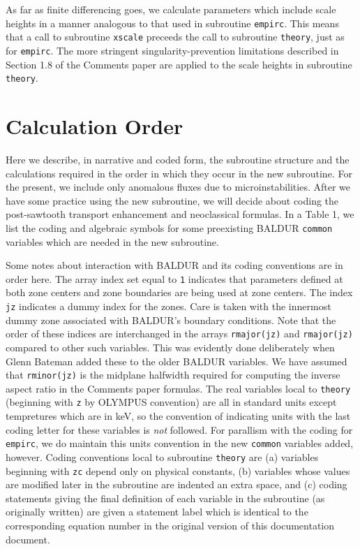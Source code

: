 As far as finite differencing goes, we calculate
parameters which include scale heights in a manner analogous to
that used in subroutine {\tt empirc}.  This means that a call to subroutine
{\tt xscale} preceeds the call to  subroutine {\tt theory},
just as for {\tt empirc}.  The more stringent singularity-prevention
limitations described in Section 1.8 of the Comments paper are applied
to the scale heights in subroutine {\tt theory}.


\section{Calculation Order}

Here we describe, in narrative and coded form,
the subroutine structure and the calculations required
in the order in which they occur in the new subroutine.
For the present, we include only anomalous fluxes due to microinstabilities.
After we have some practice using the new subroutine,
we will decide about coding the
post-sawtooth transport enhancement and neoclassical formulas.
In a Table 1, we list the coding
and algebraic symbols for some preexisting BALDUR
{\tt common} variables which are needed in the new subroutine.

Some notes about interaction with BALDUR and its coding
conventions are in order here.
The array index set equal to {\tt 1} indicates
that parameters defined at both zone centers and zone boundaries
are being used at zone centers.  The index {\tt jz}
indicates a dummy index for the zones.  Care is taken
with the innermost dummy zone associated with
BALDUR's boundary conditions.  Note that the order of these
indices are interchanged in the arrays {\tt rmajor(jz)} and
{\tt rmajor(jz)} compared to other such variables.
This was evidently done deliberately when Glenn Bateman
added these to the older
BALDUR variables.
We have assumed that {\tt rminor(jz)} is
the midplane halfwidth required for computing the inverse
aspect ratio in the Comments paper formulas.
The real variables local to {\tt theory}
(beginning with {\tt z} by OLYMPUS convention)
are all in standard units except tempretures which are
in keV, so the
convention of indicating units with
the last coding letter for these variables is {\it not}
followed.  For parallism  with the
coding for {\tt empirc}, we do
maintain this units convention in the new
{\tt common} variables added, however.
Coding conventions local to subroutine {\tt theory}
are (a) variables beginning with {\tt zc}
depend only on physical constants, (b) variables whose values are
modified later in the subroutine are indented an extra space,
and (c) coding statements giving the final definition
of each variable in the subroutine (as originally written)
are given a statement label which is identical to
the corresponding equation number in the original
version of this documentation document.

